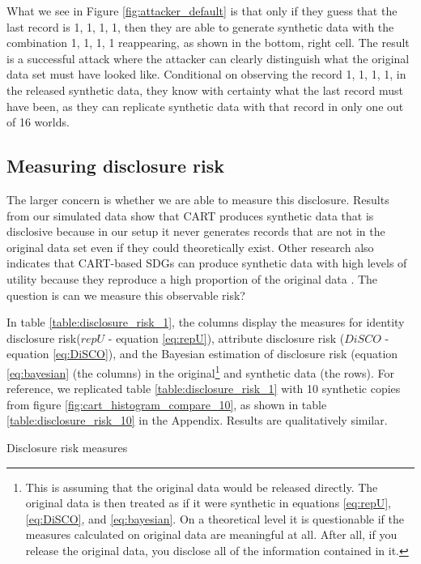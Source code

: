 \documentclass[a4paper,11pt]{style/uneceart}
\begin{document}
What we see in Figure \ref{fig:attacker_default} is that only if they guess that the last record is 1, 1, 1, 1, then they are able to generate synthetic data with the combination 1, 1, 1, 1 reappearing, as shown in the bottom, right cell.  The result is a successful attack where the attacker can clearly distinguish what the original data set must have looked like. Conditional on observing the record 1, 1, 1, 1, in the released synthetic data, they know with certainty what the last record must have been, as they can replicate synthetic data with that record in only one out of 16 worlds.

\subsection{Measuring disclosure risk}

The larger concern is whether we are able to measure this disclosure.  Results from our simulated data show that CART produces synthetic data that is disclosive because in our setup it never generates records that are not in the  original data set even if they could theoretically exist.  Other research also indicates that CART-based SDGs can produce synthetic data with high levels of utility because they reproduce a high proportion of the original data \citep{manrique2018bayesian}.  The question is can we measure this observable risk?

In table \ref{table:disclosure_risk_1}, the columns display the measures for identity disclosure risk($repU$ - equation \ref{eq:repU}), attribute disclosure risk ($DiSCO$ - equation \ref{eq:DiSCO}), and the Bayesian estimation of disclosure risk (equation \ref{eq:bayesian} (the columns) in the original\footnote{This is assuming that the original data would be released directly. The original data is then treated as if it were synthetic in equations \ref{eq:repU}, \ref{eq:DiSCO}, and \ref{eq:bayesian}. On a theoretical level it is questionable if the measures calculated on original data are meaningful at all. After all, if you release the original data, you disclose all of the information contained in it.} and synthetic data (the rows).  For reference, we replicated table \ref{table:disclosure_risk_1} with 10 synthetic copies from figure \ref{fig:cart_histogram_compare_10}, as shown in table \ref{table:disclosure_risk_10} in the Appendix.  Results are qualitatively similar.  

\begin{table}[]
    \centering
    \caption{Disclosure risk measures}
    
    \label{table:disclosure_risk_1}
\end{table}
\end{document}
